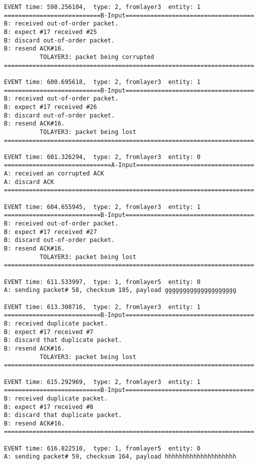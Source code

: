 \documentclass[12pt]{article}
\begin{document}
\begin{verbatim}
EVENT time: 598.256104,  type: 2, fromlayer3  entity: 1
===========================B-Input====================================
B: received out-of-order packet.
B: expect #17 received #25
B: discard out-of-order packet.
B: resend ACK#16.
          TOLAYER3: packet being corrupted
======================================================================

EVENT time: 600.695618,  type: 2, fromlayer3  entity: 1
===========================B-Input====================================
B: received out-of-order packet.
B: expect #17 received #26
B: discard out-of-order packet.
B: resend ACK#16.
          TOLAYER3: packet being lost
======================================================================

EVENT time: 601.326294,  type: 2, fromlayer3  entity: 0
==============================A-Input=================================
A: received an corrupted ACK 
A: discard ACK
======================================================================

EVENT time: 604.655945,  type: 2, fromlayer3  entity: 1
===========================B-Input====================================
B: received out-of-order packet.
B: expect #17 received #27
B: discard out-of-order packet.
B: resend ACK#16.
          TOLAYER3: packet being lost
======================================================================

EVENT time: 611.533997,  type: 1, fromlayer5  entity: 0
A: sending packet# 58, checksum 185, payload gggggggggggggggggggg	

EVENT time: 613.308716,  type: 2, fromlayer3  entity: 1
===========================B-Input====================================
B: received duplicate packet.
B: expect #17 received #7
B: discard that duplicate packet.
B: resend ACK#16.
          TOLAYER3: packet being lost
======================================================================

EVENT time: 615.292969,  type: 2, fromlayer3  entity: 1
===========================B-Input====================================
B: received duplicate packet.
B: expect #17 received #8
B: discard that duplicate packet.
B: resend ACK#16.
======================================================================

EVENT time: 616.822510,  type: 1, fromlayer5  entity: 0
A: sending packet# 59, checksum 164, payload hhhhhhhhhhhhhhhhhhhh



\end{verbatim}
\end{document}
